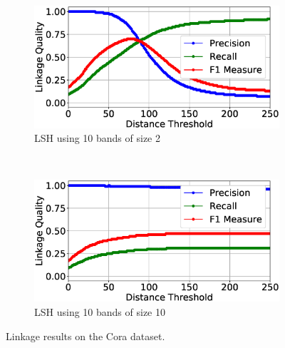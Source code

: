 \documentclass{llncs}
\begin{document}
\begin{figure}
\begin{subfigure}{.47\textwidth}
  \centering
\includegraphics[width=\textwidth]{figures/plotLQ-cora-lsh-10-2}
\vspace{-6mm}
\caption{LSH using 10 bands of size 2}
\end{subfigure}%
~~
\begin{subfigure}{.47\textwidth}
  \centering
\includegraphics[width=\textwidth]{figures/plotLQ-cora-lsh-10-10}
\vspace{-6mm}
\caption{LSH using 10 bands of size 10}
\end{subfigure}

\caption{Linkage results on the Cora dataset.}
\label{cora-quality}
\end{figure}

\end{document}
